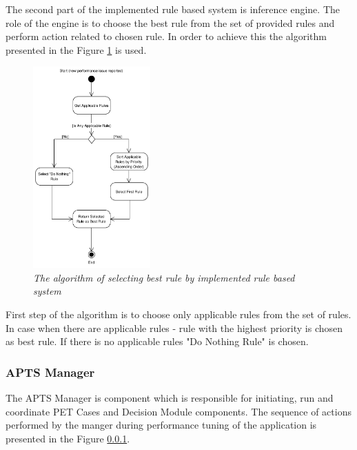 \documentclass[12pt,a4paper]{article}
\begin{document}
\pagebreak


The second part of the implemented rule based system is inference engine. The role of the engine is to choose the best rule from the set of provided rules and perform action related to chosen rule. In order to achieve this the algorithm presented in the Figure \ref{dmalgorithm} is used. 

\begin{figure}[!htb]
\centering
\includegraphics[width=0.4\textwidth]{DecisionModuleActivityDiagram}
\caption{\textit{The algorithm of selecting best rule by implemented rule based system}} \label{dmalgorithm}
\end{figure}

First step of the algorithm is to choose only applicable rules from the set of rules. In case when there are applicable rules - rule with the highest priority is chosen as best rule. If there is no applicable rules "Do Nothing Rule" is chosen.

\subsubsection{APTS Manager} \label{manager}

The APTS Manager is component which is responsible for initiating, run and coordinate PET Cases and Decision Module components. The sequence of actions performed by the manger during performance tuning of the application is presented in the Figure \ref{manager}.
\end{document}
